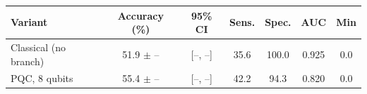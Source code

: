 \begin{tabular}{lcccccc}
\toprule
Variant & Accuracy (\%) & 95\% CI & Sens. & Spec. & AUC & Min \\
\midrule
Classical (no branch) & 51.9 $\pm$ -- & [--, --] & 35.6 & 100.0 & 0.925 & 0.0 \\
PQC, 8 qubits & 55.4 $\pm$ -- & [--, --] & 42.2 & 94.3 & 0.820 & 0.0 \\
\bottomrule
\end{tabular}